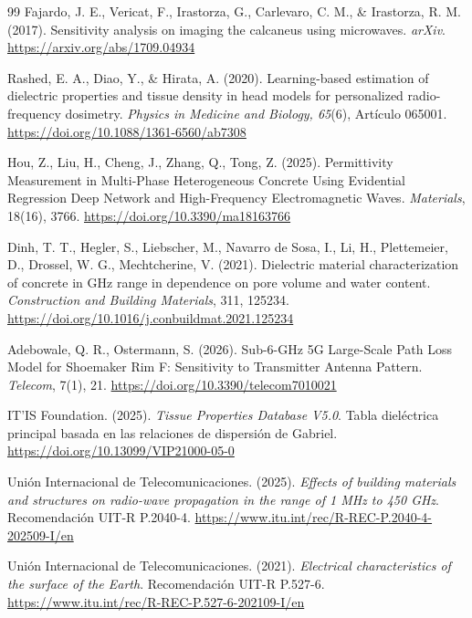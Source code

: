 \begin{thebibliography}{99}
Fajardo, J. E., Vericat, F., Irastorza, G., Carlevaro, C. M., \& Irastorza, R. M. (2017). Sensitivity analysis on imaging the calcaneus using microwaves. \textit{arXiv}. \url{https://arxiv.org/abs/1709.04934}

Rashed, E. A., Diao, Y., \& Hirata, A. (2020). Learning-based estimation of dielectric properties and tissue density in head models for personalized radio-frequency dosimetry. \textit{Physics in Medicine and Biology, 65}(6), Artículo 065001. \url{https://doi.org/10.1088/1361-6560/ab7308}

Hou, Z., Liu, H., Cheng, J., Zhang, Q., Tong, Z. (2025). Permittivity Measurement in Multi-Phase Heterogeneous Concrete Using Evidential Regression Deep Network and High-Frequency Electromagnetic Waves. \textit{Materials}, 18(16), 3766. \url{https://doi.org/10.3390/ma18163766}

Dinh, T. T., Hegler, S., Liebscher, M., Navarro de Sosa, I., Li, H., Plettemeier, D., Drossel, W. G., Mechtcherine, V. (2021). Dielectric material characterization of concrete in GHz range in dependence on pore volume and water content. \textit{Construction and Building Materials}, 311, 125234. \url{https://doi.org/10.1016/j.conbuildmat.2021.125234}

Adebowale, Q. R., Ostermann, S. (2026). Sub-6-GHz 5G Large-Scale Path Loss Model for Shoemaker Rim F: Sensitivity to Transmitter Antenna Pattern. \textit{Telecom}, 7(1), 21. \url{https://doi.org/10.3390/telecom7010021}

IT'IS Foundation. (2025). \textit{Tissue Properties Database V5.0}. Tabla dieléctrica principal basada en las relaciones de dispersión de Gabriel. \url{https://doi.org/10.13099/VIP21000-05-0}

Unión Internacional de Telecomunicaciones. (2025). \textit{Effects of building materials and structures on radio-wave propagation in the range of 1 MHz to 450 GHz}. Recomendación UIT-R P.2040-4. \url{https://www.itu.int/rec/R-REC-P.2040-4-202509-I/en}

Unión Internacional de Telecomunicaciones. (2021). \textit{Electrical characteristics of the surface of the Earth}. Recomendación UIT-R P.527-6. \url{https://www.itu.int/rec/R-REC-P.527-6-202109-I/en}

\end{thebibliography}
\endgroup
